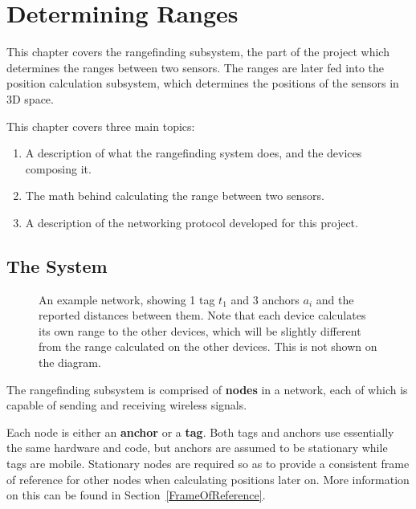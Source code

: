 
\chapter{Determining Ranges} %

\label{Rangefinding}


This chapter covers the rangefinding subsystem, the part of the project which determines the ranges between two sensors. The ranges are later fed into the position calculation subsystem, which determines the positions of the sensors in 3D space.

This chapter covers three main topics:
\begin{enumerate}
	\item A description of what the rangefinding system does, and the devices composing it.
	\item The math behind calculating the range between two sensors.
	\item A description of the networking protocol developed for this project.
\end{enumerate}

\section{The System}
\begin{figure}
	\centering
	
	\decoRule
	\caption{An example network, showing 1 tag $t_1$ and 3 anchors $a_i$ and the reported distances between them. Note that each device calculates its own range to the other devices, which will be slightly different from the range calculated on the other devices. This is not shown on the diagram.}
	\label{fig:ExampleNetwork}
\end{figure}

The rangefinding subsystem is comprised of \textbf{nodes} in a network, each of which is capable of sending and receiving wireless signals.

Each node is either an \textbf{anchor} or a \textbf{tag}. Both tags and anchors use essentially the same hardware and code, but anchors are assumed to be stationary while tags are mobile. Stationary nodes are required so as to provide a consistent frame of reference for other nodes when calculating positions later on. More information on this can be found in Section~\ref{FrameOfReference}.

